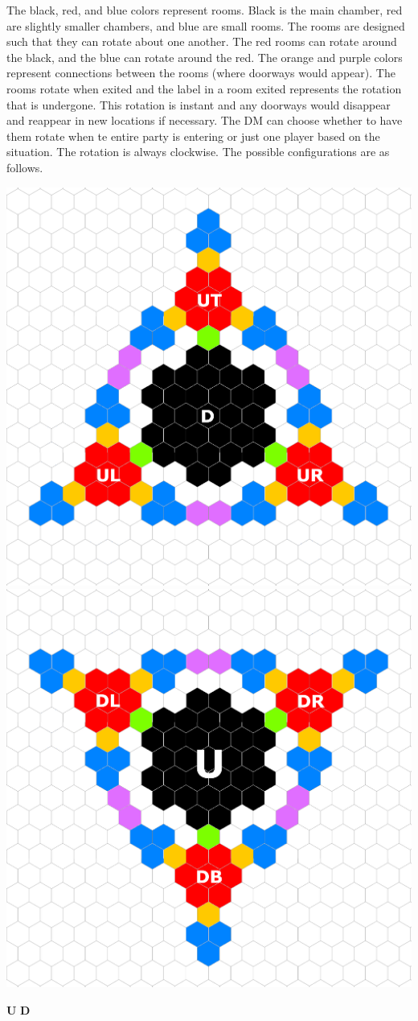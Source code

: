 The black, red, and blue colors represent rooms. Black is the main chamber, red are slightly smaller chambers, and blue are small rooms. The rooms are designed such that they can rotate about one another. The red rooms can rotate around the black, and the blue can rotate around the red. The orange and purple colors represent connections between the rooms (where doorways would appear). The rooms rotate when exited and the label in a room exited represents the rotation that is undergone. This rotation is instant and any doorways would disappear and reappear in new locations if necessary. The DM can choose whether to have them rotate when te entire party is entering or just one player based on the situation. The rotation is always clockwise. The possible configurations are as follows.

\begin{center}
	\includegraphics[width=0.45\linewidth]{img/Aethereu/U.png}
	\includegraphics[width=0.45\linewidth]{img/Aethereu/D.png}
	
	\textbf{U} \hspace{7.5cm} \textbf{D}
	

\end{center}
